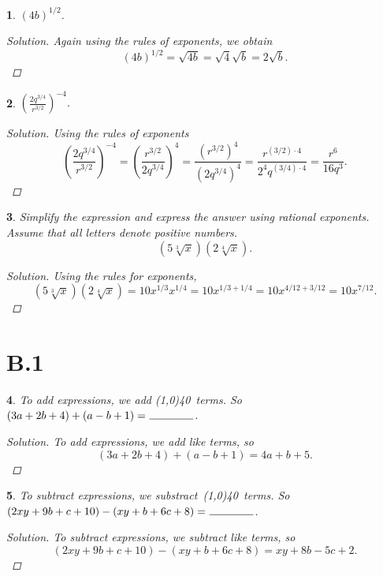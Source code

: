 \documentclass[12pt]{amsart}
\newtheorem{thm}{}
\begin{document}
\setcounter{thm}{24}
\begin{thm}
  $\displaystyle{\left(4b\right)^{1/2}}$.
  
  \begin{proof}[Solution]
    Again using the rules of exponents, we obtain
    $$\left(4b\right)^{1/2} = \sqrt{4b} = \sqrt{4}\sqrt{b} = 2\sqrt{b}.$$
  \end{proof}
\end{thm}

\setcounter{thm}{32}
\begin{thm}
  $\displaystyle{\left(\frac{2q^{3/4}}{r^{3/2}}\right)}^{-4}$.
  
  \begin{proof}[Solution]
    Using the rules of exponents
    $$\left(\frac{2q^{3/4}}{r^{3/2}}\right)^{-4} = \left(\frac{r^{3/2}}{2q^{3/4}}\right)^{4} = \frac{(r^{3/2})^4}{(2q^{3/4})^4} = \frac{r^{(3/2)\cdot 4}}{2^4q^{(3/4)\cdot 4}} = \frac{r^6}{16q^3}.$$
  \end{proof}
\end{thm}

\setcounter{thm}{40}
\begin{thm}
  Simplify the expression and express the answer using rational exponents.
  Assume that all letters denote positive numbers.
  $$\left(5\sqrt[3]{x}\right)\left(2\sqrt[4]{x}\right).$$
  
  \begin{proof}[Solution]
    Using the rules for exponents,
    $$\left(5\sqrt[3]{x}\right)\left(2\sqrt[4]{x}\right) = 10x^{1/3}x^{1/4} = 10x^{1/3 + 1/4} = 10x^{4/12 + 3/12} = 10x^{7/12}.$$
  \end{proof}
\end{thm}

\section*{B.1}

\setcounter{thm}{0}
\begin{thm}
  To add expressions, we add \line(1,0){40}\ terms.
  So\\
  \indent $(3a + 2b + 4) + (a - b + 1) =\ \line(1,0){40}$.
  
  \begin{proof}[Solution]
    To add expressions, we add like terms, so
    $$(3a + 2b + 4) + (a - b + 1) = 4a + b + 5.$$
  \end{proof}
\end{thm}

\begin{thm}
  To subtract expressions, we substract\ \line(1,0){40}\ terms.
  So\\ 
  \indent $(2xy + 9b + c + 10) - (xy + b + 6c + 8) =\ \line(1,0){40}$.
  \begin{proof}[Solution]
    To subtract expressions, we subtract like terms, so
    $$(2xy + 9b + c + 10) - (xy + b + 6c + 8) = xy + 8b -5c + 2.$$
  \end{proof}
\end{thm}
\end{document}
